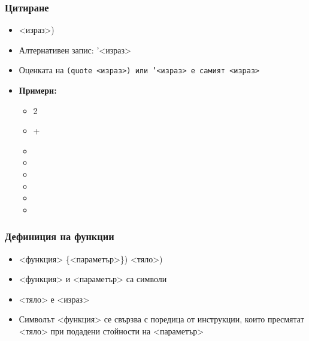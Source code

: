 \documentclass[alsotrans,beameroptions={aspectratio=169}]{beamerswitch}
\begin{document}
\begin{frame}
  \frametitle{Цитиране}

  \begin{itemize}[<+->]
  \item {} <израз>\tta)
  \item Алтернативен запис: \tta'<израз>
  \item Оценката на \tt{(quote} <израз>\tt) или \tt'{}<израз> е самият <израз>
  \item \textbf{Примери:}
    \begin{itemize}
    \item {}2
    \item {}+
    \item {}
    \item {}
    \item {}
    \item {}
    \item {}
    \item {}
    \end{itemize}
  \end{itemize}
\end{frame}

\begin{frame}
  \frametitle{Дефиниция на функции}

  \begin{itemize}[<+->]
  \item {}<функция> \{{}<параметър>\}\tta) <тяло>\tta)
  \item {}<функция> и <параметър> са символи
  \item {}<тяло> е <израз>
  \item Символът <функция> се свързва с поредица от инструкции, които пресмятат <тяло> при подадени стойности на <параметър>
  \end{itemize}
\end{frame}
\end{document}
